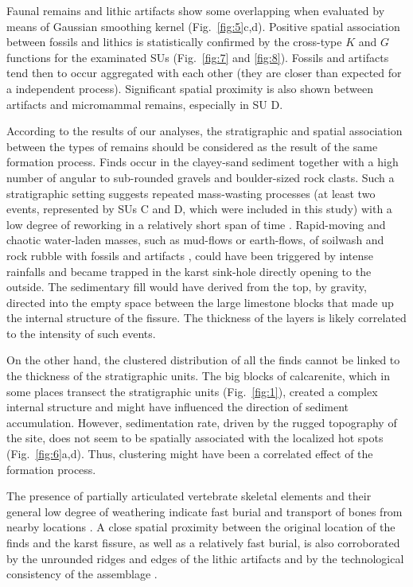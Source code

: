 \documentclass[review,authoryear]{elsarticle} %
\begin{document}
Faunal remains and lithic artifacts show some overlapping when evaluated by means of Gaussian smoothing kernel (Fig.~\ref{fig:5}c,d). Positive spatial association between fossils and lithics is statistically confirmed by the cross-type $K$  and $G$ functions for the examinated SUs (Fig.~\ref{fig:7} and \ref{fig:8}). Fossils and artifacts tend then to occur aggregated with each other (they are closer than expected for a independent process). Significant spatial proximity is also shown between artifacts and micromammal remains, especially in SU D.

According to the results of our analyses, the stratigraphic and spatial association between the types of remains should be considered as the result of the same formation process. Finds occur in the clayey-sand sediment together with a high number of angular to sub-rounded gravels and boulder-sized rock clasts. Such a stratigraphic setting suggests repeated mass-wasting processes (at least two events, represented by SUs C and D, which were included in this study) with a low degree of reworking in a relatively short span of time \citep{Arzarello2012}. Rapid-moving and chaotic water-laden masses, such as mud-flows or earth-flows, of soilwash and rock rubble with fossils and artifacts \citep[p.~46]{Butzer1982}, could have been triggered by intense rainfalls and became trapped in the karst sink-hole directly opening to the outside. The sedimentary fill would have derived from the top, by gravity, directed into the empty space between the large limestone blocks that made up the internal structure of the fissure. The thickness of the layers is likely correlated to the intensity of such events.

On the other hand, the clustered distribution of all the finds cannot be linked to the thickness of the stratigraphic units. The big blocks of calcarenite, which in some places transect the stratigraphic units (Fig.~\ref{fig:1}), created a complex internal structure and might have influenced the direction of sediment accumulation. However, sedimentation rate, driven by the rugged topography of the site, does not seem to be spatially associated with the localized hot spots (Fig.~\ref{fig:6}a,d). Thus, clustering might have been a correlated effect of the formation process.

The presence of partially articulated vertebrate skeletal elements and their general low degree of weathering indicate fast burial and transport of bones from nearby locations \citep{Bagnus2011}. A close spatial proximity between the original location of the finds and the karst fissure, as well as a relatively fast burial, is also corroborated by the unrounded ridges and edges of the lithic artifacts and by the technological consistency of the assemblage \citep{Arzarello2015}.
\end{document}
